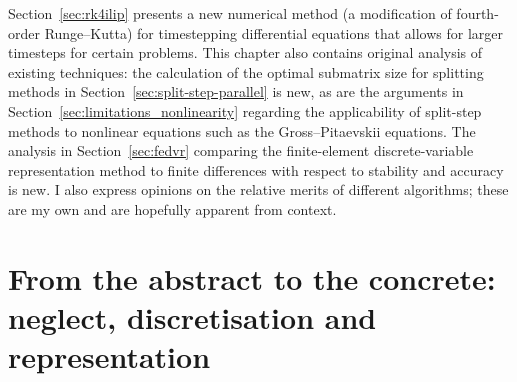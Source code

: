 Section~\ref{sec:rk4ilip} presents a new numerical method (a modification of fourth-order Runge--Kutta) for timestepping differential equations that allows for larger timesteps for certain problems. This chapter also contains original analysis of existing techniques: the calculation of the optimal submatrix size for splitting methods in Section~\ref{sec:split-step-parallel} is new, as are the arguments in Section~\ref{sec:limitations_nonlinearity} regarding the applicability of split-step methods to nonlinear equations such as the Gross--Pitaevskii equations. The analysis in Section~\ref{sec:fedvr} comparing the finite-element discrete-variable representation method to finite differences with respect to stability and accuracy is new. I also express opinions on the relative merits of different algorithms; these are my own and are hopefully apparent from context.

\section{From the abstract to the concrete: neglect, discretisation and representation}\label{sec:neglect_discretisation}

